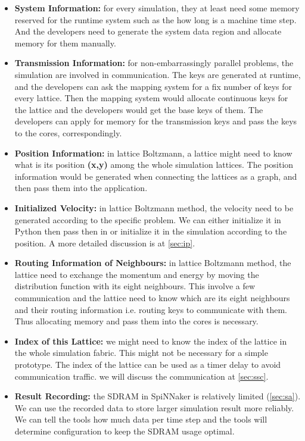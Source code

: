 \begin{itemize}
    \item \textbf{System Information:} for every simulation, they at least need some memory reserved for the runtime system such as the how long is a machine time step. And the developers need to generate the system data region and allocate memory for them manually.
    
    \item \textbf{Transmission Information:} for non-embarrassingly parallel problems, the simulation are involved in communication. The keys are generated at runtime, and the developers can ask the mapping system for a fix number of keys for every lattice. Then the mapping system would allocate continuous keys for the lattice and the developers would get the base keys of them. The developers can apply for memory for the transmission keys and pass the keys to the cores, correspondingly.

    \item \textbf{Position Information:} in lattice Boltzmann, a lattice might need to know what is its position \textbf{(x,y)} among the whole simulation lattices. The position information would be generated when connecting the lattices as a graph, and then pass them into the application.
    
    \item \textbf{Initialized Velocity:} in lattice Boltzmann method, the velocity need to be generated according to the specific problem. We can either initialize it in Python then pass then in or initialize it in the simulation according to the position. A more detailed discussion is at \ref{sec:ip}.
    
    \item \textbf{Routing Information of Neighbours:} in lattice Boltzmann method, the lattice need to exchange the momentum and energy by moving the distribution function with its eight neighbours. This involve a few communication and the lattice need to know which are its eight neighbours and their routing information i.e. routing keys to communicate with them. Thus allocating memory and pass them into the cores is necessary. 
    
    \item \textbf{Index of this Lattice:} we might need to know the index of the lattice in the whole simulation fabric. This might not be necessary for a simple prototype. The index of the lattice can be used as a timer delay to avoid communication traffic. we will discuss the communication at \ref{sec:ssc}.
    
    \item \textbf{Result Recording:} the SDRAM in SpiNNaker is relatively limited (\ref{sec:sa}). We can use the recorded data to store larger simulation result more reliably. We can tell the tools how much data per time step and the tools will determine configuration to keep the SDRAM usage optimal.
\end{itemize}

